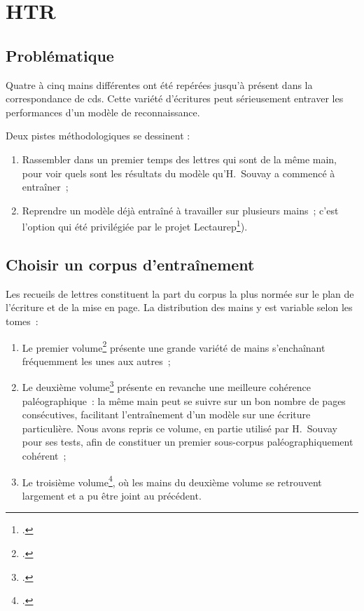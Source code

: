 \documentclass[a4paper,12pt,twoside]{book}
\begin{document}
	
	\tableofcontents
	
	\chapter{HTR}
		
		\section{Problématique}
		Quatre à cinq mains différentes ont été repérées jusqu'à présent dans la correspondance de \gls{cds}. Cette variété d'écritures peut sérieusement entraver les performances d'un modèle de reconnaissance.
		
		Deux pistes méthodologiques se dessinent :
		\begin{enumerate}
			\item Rassembler dans un premier temps des lettres qui sont de la même main, pour voir quels sont les résultats du modèle qu'H. Souvay a commencé à entraîner ;
			\item Reprendre un modèle déjà entraîné à travailler sur plusieurs mains ; c'est l'option qui été privilégiée par le projet Lectaurep\footcite{chagueCreationModelesTranscriptiona}).
		\end{enumerate}
		
				
		\section{Choisir un corpus d'entraînement}
		Les recueils de lettres constituent la part du corpus la plus normée sur le plan de l'écriture et de la mise en page. La distribution des mains y est variable selon les tomes :
		\begin{enumerate}
			\item Le premier volume\footcite{salmCorrespondanceGeneraleSecondea} présente une grande variété de mains s'enchaînant fréquemment les unes aux autres~;
			\item Le deuxième volume\footcite{salmCorrespondanceGeneraleSeconde}  présente en revanche une meilleure cohérence paléographique : la même main peut se suivre sur un bon nombre de pages consécutives, facilitant l'entraînement d'un modèle sur une écriture particulière. Nous avons repris ce volume, en partie utilisé par H. Souvay pour ses tests, afin de constituer un premier sous-corpus paléographiquement cohérent~;
			\item Le troisième volume\footcite{salmCorrespondanceGeneraleSecondeb}, où les mains du deuxième volume se retrouvent largement et a pu être joint au précédent.
		\end{enumerate}
	
\end{document}
